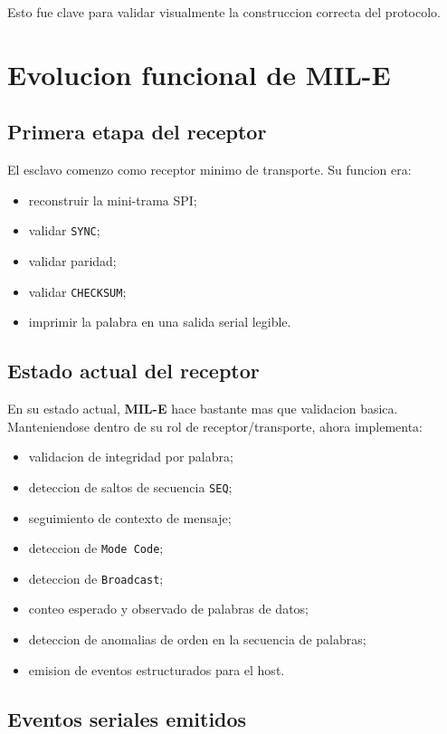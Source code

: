 \documentclass[12pt,a4paper]{article}
\begin{document}
Esto fue clave para validar visualmente la construccion correcta del protocolo.

\section{Evolucion funcional de MIL-E}

\subsection{Primera etapa del receptor}

El esclavo comenzo como receptor minimo de transporte. Su funcion era:

\begin{itemize}
    \item reconstruir la mini-trama SPI;
    \item validar \texttt{SYNC};
    \item validar paridad;
    \item validar \texttt{CHECKSUM};
    \item imprimir la palabra en una salida serial legible.
\end{itemize}

\subsection{Estado actual del receptor}

En su estado actual, \textbf{MIL-E} hace bastante mas que validacion basica. Manteniendose dentro
de su rol de receptor/transporte, ahora implementa:

\begin{itemize}
    \item validacion de integridad por palabra;
    \item deteccion de saltos de secuencia \texttt{SEQ};
    \item seguimiento de contexto de mensaje;
    \item deteccion de \texttt{Mode Code};
    \item deteccion de \texttt{Broadcast};
    \item conteo esperado y observado de palabras de datos;
    \item deteccion de anomalias de orden en la secuencia de palabras;
    \item emision de eventos estructurados para el host.
\end{itemize}

\subsection{Eventos seriales emitidos}
\end{document}
